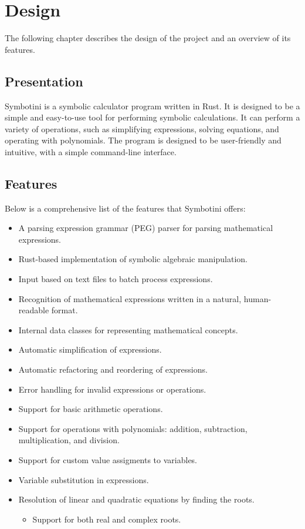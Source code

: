 \chapter{Design}\label{chap:design}

The following chapter describes the design of the project and an overview of its features.

\section{Presentation}\label{sec:presentation}

Symbotini is a symbolic calculator program written in Rust. It is designed to be a simple and easy-to-use tool for performing symbolic calculations. It can perform a variety of operations, such as simplifying expressions, solving equations, and operating with polynomials. The program is designed to be user-friendly and intuitive, with a simple command-line interface.

\section{Features}\label{sec:features}

Below is a comprehensive list of the features that Symbotini offers:

\begin{itemize}
    \item A parsing expression grammar (PEG) parser for parsing mathematical expressions.
    \item Rust-based implementation of symbolic algebraic manipulation.
    \item Input based on text files to batch process expressions.
    \item Recognition of mathematical expressions written in a natural, human-readable format.
    \item Internal data classes for representing mathematical concepts.
    \item Automatic simplification of expressions.
    \item Automatic refactoring and reordering of expressions.
    \item Error handling for invalid expressions or operations.
    \item Support for basic arithmetic operations.
    \item Support for operations with polynomials: addition, subtraction, multiplication, and division.
    \item Support for custom value assigments to variables.
    \item Variable substitution in expressions.
    \item Resolution of linear and quadratic equations by finding the roots.
        \begin{itemize}
            \item Support for both real and complex roots.
        \end{itemize}
\end{itemize}

